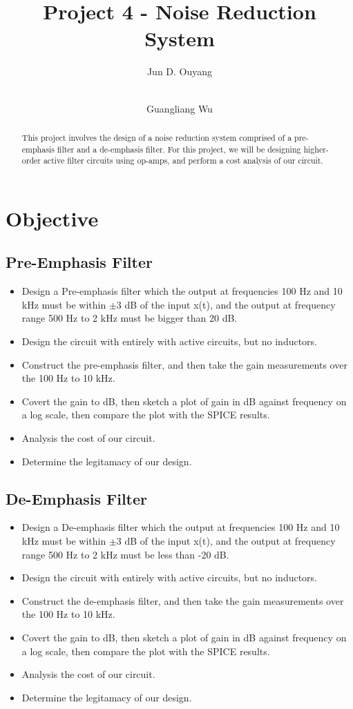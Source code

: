 \documentclass[report]{IEEEtran}
\begin{document}
	
	\title{Project 4 - Noise Reduction System}
	\author{Jun D. Ouyang \and \\Guangliang Wu }
	\maketitle
	
	\begin{abstract}
		This project involves the design of a noise reduction system comprised of a pre-emphasis filter and a de-emphasis filter. For this project, we will be designing higher-order active filter circuits using op-amps, and perform a cost analysis of our circuit.
	\end{abstract}
	\section{Objective}
		\subsection{Pre-Emphasis Filter}
			\begin{itemize}
				\item{Design a Pre-emphasis filter which the output at frequencies 100 Hz and 10 kHz must be within $\pm 3$ dB of the input x(t), and the output at frequency range 500 Hz to 2 kHz must be bigger than 20 dB.}
				\item{Design the circuit with entirely with active circuits, but no inductors.}
				\item{Construct the pre-emphasis filter, and then take the gain measurements over the 100 Hz to 10 kHz. }
				\item{Covert the gain to dB, then sketch a plot of gain in dB against frequency on a log scale, then compare the plot with the SPICE results.}
				\item{Analysis the cost of our circuit.}
				\item{Determine the legitamacy of our design.}
			\end{itemize}
		\subsection{De-Emphasis Filter}
			\begin{itemize}
				\item{Design a De-emphasis filter which the output at frequencies 100 Hz and 10 kHz must be within $\pm 3$ dB of the input x(t), and the output at frequency range 500 Hz to 2 kHz must be less than -20 dB.}
				\item{Design the circuit with entirely with active circuits, but no inductors.}
				\item{Construct the de-emphasis filter, and then take the gain measurements over the 100 Hz to 10 kHz. }
				\item{Covert the gain to dB, then sketch a plot of gain in dB against frequency on a log scale, then compare the plot with the SPICE results.}
				\item{Analysis the cost of our circuit.}
				\item{Determine the legitamacy of our design.}
			\end{itemize}
\end{document}
